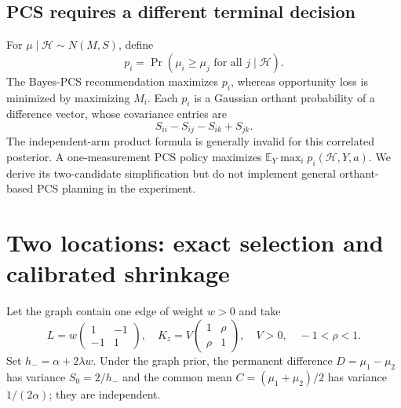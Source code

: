 \documentclass[11pt]{article}
\newcommand{\E}{\mathbb E}
\begin{document}
\subsection{PCS requires a different terminal decision}
For $\mu\mid\mathcal H\sim N(M,S)$, define
\begin{equation}
p_i=\Pr(\mu_i\ge\mu_j\text{ for all }j\mid\mathcal H).
\end{equation}
The Bayes-PCS recommendation maximizes $p_i$, whereas opportunity loss is minimized by maximizing $M_i$. Each $p_i$ is a Gaussian orthant probability of a difference vector, whose covariance entries are
\begin{equation}
S_{ii}-S_{ij}-S_{ik}+S_{jk}.
\end{equation}
The independent-arm product formula is generally invalid for this correlated posterior. A one-measurement PCS policy maximizes $\E_Y\max_i p_i(\mathcal H,Y,a)$. We derive its two-candidate simplification but do not implement general orthant-based PCS planning in the experiment.

\section{Two locations: exact selection and calibrated shrinkage}
Let the graph contain one edge of weight $w>0$ and take
\begin{equation}
L=w\begin{pmatrix}1&-1\\-1&1\end{pmatrix},\quad
K_z=V\begin{pmatrix}1&\rho\\\rho&1\end{pmatrix},
\quad V>0,\quad -1<\rho<1.
\label{eq:two-arm}
\end{equation}
Set $h_-=\alpha+2\lambda w$. Under the graph prior, the permanent difference $D=\mu_1-\mu_2$ has variance $S_0=2/h_-$ and the common mean $C=(\mu_1+\mu_2)/2$ has variance $1/(2\alpha)$; they are independent.
\end{document}

